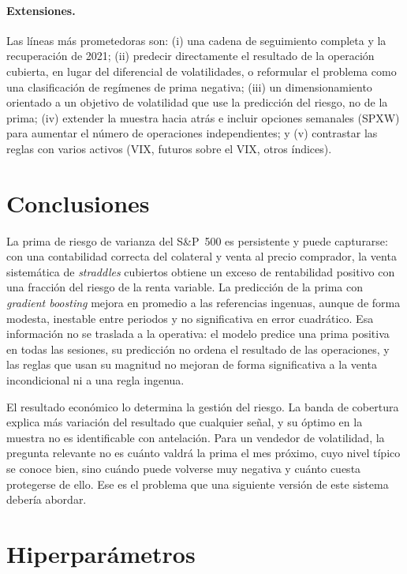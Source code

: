 \documentclass[11pt,a4paper]{article}
\begin{document}
\paragraph{Extensiones.} Las líneas más prometedoras son: (i) una cadena de seguimiento completa y la recuperación de 2021; (ii) predecir directamente el resultado de la operación cubierta, en lugar del diferencial de volatilidades, o reformular el problema como una clasificación de regímenes de prima negativa; (iii) un dimensionamiento orientado a un objetivo de volatilidad que use la predicción del riesgo, no de la prima; (iv) extender la muestra hacia atrás e incluir opciones semanales (SPXW) para aumentar el número de operaciones independientes; y (v) contrastar las reglas con varios activos (VIX, futuros sobre el VIX, otros índices).

\section{Conclusiones}\label{sec:conclusiones}

La prima de riesgo de varianza del S\&P~500 es persistente y puede capturarse: con una contabilidad correcta del colateral y venta al precio comprador, la venta sistemática de \textit{straddles} cubiertos obtiene un exceso de rentabilidad positivo con una fracción del riesgo de la renta variable. La predicción de la prima con \textit{gradient boosting} mejora en promedio a las referencias ingenuas, aunque de forma modesta, inestable entre periodos y no significativa en error cuadrático. Esa información no se traslada a la operativa: el modelo predice una prima positiva en todas las sesiones, su predicción no ordena el resultado de las operaciones, y las reglas que usan su magnitud no mejoran de forma significativa a la venta incondicional ni a una regla ingenua.

El resultado económico lo determina la gestión del riesgo. La banda de cobertura explica más variación del resultado que cualquier señal, y su óptimo en la muestra no es identificable con antelación. Para un vendedor de volatilidad, la pregunta relevante no es cuánto valdrá la prima el mes próximo, cuyo nivel típico se conoce bien, sino cuándo puede volverse muy negativa y cuánto cuesta protegerse de ello. Ese es el problema que una siguiente versión de este sistema debería abordar.

\FloatBarrier



\clearpage
\appendix
\section{Hiperparámetros}\label{app:hiper}
\end{document}
